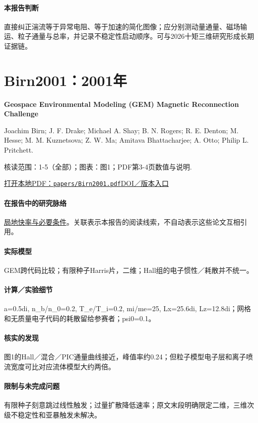 \documentclass[UTF8,a4paper,11pt,openany,fontset=fandol]{ctexbook}
\begin{document}
\paragraph{本报告判断}直接纠正湍流等于异常电阻、等于加速的简化图像；应分别测动量通量、磁场输运、粒子通量与总率，并记录不稳定性启动顺序。可与2026十矩三维研究形成长期证据链。

\section{Birn2001：2001年}\label{paper:Birn2001}

\textbf{Geospace Environmental Modeling (GEM) Magnetic Reconnection Challenge}\citep{Birn2001}\

Joachim Birn;  J. F. Drake;  Michael A. Shay;  B. N. Rogers;  R. E. Denton;  M. Hesse;  M. M. Kuznetsova;  Z. W. Ma;  Amitava Bhattacharjee;  A. Otto;  Philip L. Pritchett.

\textsf{核读范围：}1-5（全部）；\textsf{图表：}图1；PDF第3-4页数值与说明.

\href{run:../papers/Birn2001.pdf}{打开本地PDF：\texttt{papers/Birn2001.pdf}}\quad\href{https://doi.org/10.1029/1999ja900449}{DOI／版本入口}

\paragraph{在报告中的研究脉络}\hyperref[story:fast]{局地快率与必要条件}。关联表示本报告的阅读线索，不自动表示这些论文互相引用。

\paragraph{实际模型}GEM跨代码比较；有限种子Harris片，二维；Hall组的电子惯性／耗散并不统一。

\paragraph{计算／实验细节}a=0.5di, n\_b/n\_0=0.2, T\_e/T\_i=0.2, mi/me=25, Lx=25.6di, Lz=12.8di；网格和无质量电子代码的耗散留给参赛者；psi0=0.1。

\paragraph{核实的发现}图1的Hall／混合／PIC通量曲线接近，峰值率约0.24；但粒子模型电子层和离子喷流宽度可比对应流体模型大约两倍。

\paragraph{限制与未完成问题}有限种子刻意跳过线性触发；过量扩散降低速率；原文末段明确限定二维，三维次级不稳定性和亚暴触发未解决。
\end{document}
